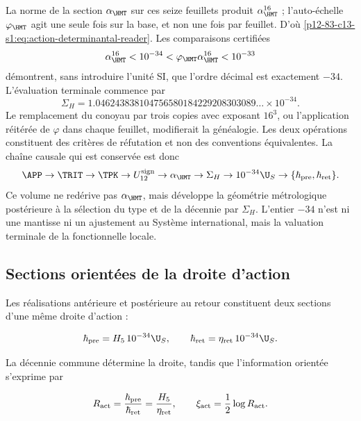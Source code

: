 La norme de la section \(\alpha_{\HMT}\) sur ces seize feuillets
produit \(\alpha_{\HMT}^{16}\) ; l'auto-échelle \(\varphi_{\HMT}\) agit
une seule fois sur la base, et non une fois par feuillet. D'où
\cref{p12-83-c13-s1:eq:action-determinantal-reader}. Les comparaisons certifiées
\begin{equation}
\alpha_{\HMT}^{16}<10^{-34}
<\varphi_{\HMT}\alpha_{\HMT}^{16}<10^{-33}
\label{p12-83-c13-s1:eq:action-decade-bounds}
\end{equation}
démontrent, sans introduire l'unité SI, que l'ordre décimal est
exactement \(-34\). L'évaluation terminale commence par
\begin{equation}
\Sigma_H
=1.046243838104756580184229208303089\ldots\times10^{-34}.
\label{p12-83-c13-s1:eq:action-sigma-value}
\end{equation}
Le remplacement du conoyau par trois copies avec exposant \(16^3\), ou
l'application réitérée de \(\varphi\) dans chaque feuillet, modifierait la
généalogie. Les deux opérations constituent des critères de réfutation et non
des conventions équivalentes.
La chaîne causale qui est conservée est donc
\[
\APP\to\TRIT\to\TPK\to U_{12}^{\rm sign}
\to\alpha_{\HMT}\to\Sigma_H
\to10^{-34}\U_S\to
\{\hbar_{\rm pre},\hbar_{\rm ret}\}.
\]
Ce volume ne redérive pas \(\alpha_{\HMT}\), mais développe la géométrie
métrologique postérieure à la sélection du type et de la décennie par
\(\Sigma_H\). L'entier \(-34\) n'est ni une mantisse ni un ajustement au Système
international, mais la valuation terminale de la fonctionnelle locale.

\subsection{Sections orientées de la droite d'action}

Les réalisations antérieure et postérieure au retour constituent deux sections
d'une même droite d'action :

\begin{equation}
\hbar_{\rm pre}=H_5\,10^{-34}\U_S,\qquad
\hbar_{\rm ret}=\eta_{\rm ret}\,10^{-34}\U_S.
\label{p12-83-c13-s1:eq:action-twoway}
\end{equation}

La décennie commune détermine la droite, tandis que l'information
orientée s'exprime par

\begin{equation}
R_{\rm act}=\frac{\hbar_{\rm pre}}{\hbar_{\rm ret}}
=\frac{H_5}{\eta_{\rm ret}},
\qquad
\xi_{\rm act}=\frac12\log R_{\rm act}.
\label{p12-83-c13-s1:eq:action-rapidity}
\end{equation}


